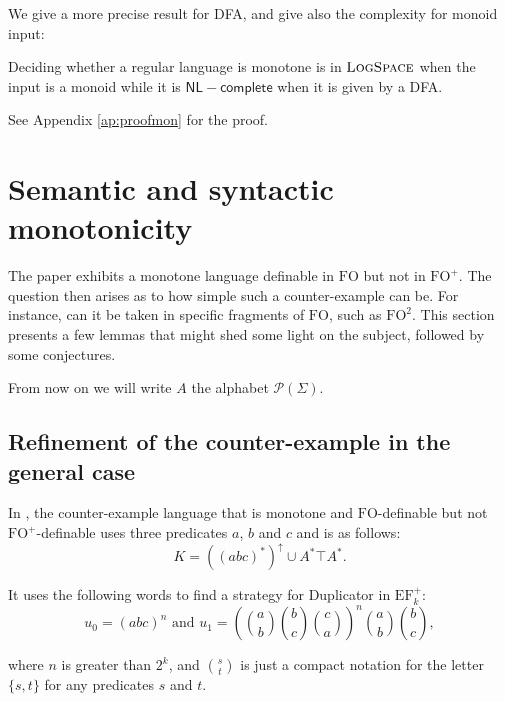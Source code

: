 \documentclass[a4paper,UKenglish,cleveref, autoref, thm-restate]{lipics-v2021}
\renewcommand{\alph}{\part(\Sigma)}
\newcommand{\FO}{\mathrm{FO}}
\newcommand{\FOp}{\FO^+}
\newcommand{\FOtw}{\FO^2}
\newcommand{\EF}{\mathrm{EF}}
\renewcommand{\part}{\mathcal{P}}
\renewcommand{\L}{\textsc{LogSpace}}
\newcommand{\NL}{\mathsf{NL}}
\newcommand{\comp}{\mathsf{complete}}
\begin{document}
We give a more precise result for DFA, and give also the complexity for monoid input:

\begin{proposition}\label{complexity}
    Deciding whether a regular language is monotone is in $\L$ when the input is a monoid while it is $\NL-\comp$ when it is given by a DFA.
\end{proposition}

See Appendix \ref{ap:proofmon} for the proof.





\section{Semantic and syntactic monotonicity} \label{sec:semVSsynt}


The paper \cite[Definition 4.2]{PFO} exhibits a monotone language definable in $\FO$ but not in $\FOp$. The question then arises as to how simple such a counter-example can be. For instance, can it be taken in specific fragments of $\FO$, such as $\FOtw$. This section presents a few lemmas that might shed some light on the subject, followed by some conjectures.

From now on we will write $A$ the alphabet $\alph$.

















\subsection{Refinement of the counter-example in the general case} \label{sec:refinement}



In \cite{PFO}, the counter-example language that is monotone and $\FO$-definable but not $\FOp$-definable uses three predicates $a$, $b$ and $c$ and is as follows:
$$
K = ((abc)^*)^{\uparrow} \cup A^* \top A^*.
$$

It uses the following words to find a strategy for Duplicator in $\EF_k^+$:
$$
u_0 = (abc)^n
\text{ and }
u_1 = \left(\binom{a}{b}\binom{b}{c}\binom{c}{a}\right)^n \binom{a}{b} \binom{b}{c},
$$

where $n$ is greater than $2^k$, and $\binom{s}{t}$ is just a compact notation for the letter $\{s,t\}$ for any predicates $s$ and $t$.
\end{document}
